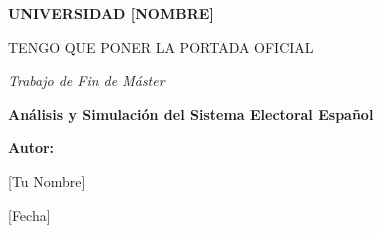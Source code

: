 \begin{titlepage}
    \centering
    \vspace*{1cm}
    
    {\bfseries\LARGE UNIVERSIDAD [NOMBRE]\par}
    \vspace{1cm}
    {\scshape\Large TENGO QUE PONER LA PORTADA OFICIAL\par}
    \vspace{2cm}
    
    {\itshape\Large Trabajo de Fin de Máster\par}
    \vspace{1.5cm}
    
    {\Huge\bfseries Análisis y Simulación del Sistema Electoral Español\par}
    \vspace{2cm}
    
    {\Large\textbf{Autor:}} \\
    {\Large [Tu Nombre]\par}
    
    \vfill
    
    {\Large [Fecha]}\par
\end{titlepage}

